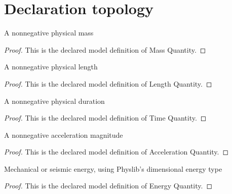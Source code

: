 \section{Declaration topology}
\begin{definition}
  \label{def:physics:phyx-mini-0326:phyxminiproblems-problemphyxmini0326-massquantity}
  A nonnegative physical mass
\end{definition}
\begin{proof}
  This is the declared model definition of Mass Quantity.
\end{proof}
\begin{definition}
  \label{def:physics:phyx-mini-0326:phyxminiproblems-problemphyxmini0326-lengthquantity}
  A nonnegative physical length
\end{definition}
\begin{proof}
  This is the declared model definition of Length Quantity.
\end{proof}
\begin{definition}
  \label{def:physics:phyx-mini-0326:phyxminiproblems-problemphyxmini0326-timequantity}
  A nonnegative physical duration
\end{definition}
\begin{proof}
  This is the declared model definition of Time Quantity.
\end{proof}
\begin{definition}
  \label{def:physics:phyx-mini-0326:phyxminiproblems-problemphyxmini0326-accelerationquantity}
  A nonnegative acceleration magnitude
\end{definition}
\begin{proof}
  This is the declared model definition of Acceleration Quantity.
\end{proof}
\begin{definition}
  \label{def:physics:phyx-mini-0326:phyxminiproblems-problemphyxmini0326-energyquantity}
  Mechanical or seismic energy, using Physlib's dimensional energy type
\end{definition}
\begin{proof}
  This is the declared model definition of Energy Quantity.
\end{proof}
